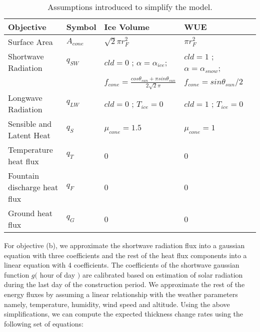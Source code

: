 \documentclass[tc, manuscript]{copernicus}
\begin{document}
\begin{table}[]
\centering
\caption{Assumptions introduced to simplify the model.}
\label{tab:assumptions}
\begin{tabular}{@{}lllll@{}}
\toprule
\textbf{Objective} & \textbf{Symbol} & \textbf{Ice Volume} & \textbf{WUE} & \\ \midrule
\multicolumn{1}{|l}{Surface Area}        & $A_{cone}$ & $ \sqrt{2} \pi r_{F}^2$ & $\pi r_{F}^2$ & \multicolumn{1}{l|}{} \\ \midrule
\multicolumn{1}{|l}{Shortwave Radiation} & $q_{SW}$ & $cld = 0$ ; $\alpha=\alpha_{ice}$; & $cld = 1$ ;
$\alpha=\alpha_{snow}$; & \multicolumn{1}{l|}{} \\ 
\multicolumn{1}{|l}{ } &  & $f_{cone} = \frac{cos \theta_{sun} + \pi sin \theta_{sun}}{2\sqrt{2}\pi}$  & $f_{cone} = sin \theta_{sun} / 2$ & \multicolumn{1}{l|}{} \\ \midrule
\multicolumn{1}{|l}{Longwave Radiation}  & $q_{LW}$ & $cld = 0$ ; $T_{ice} = 0$ & $cld = 1$ ; $T_{ice} = 0$ & \multicolumn{1}{l|}{} \\ \midrule
\multicolumn{1}{|l}{Sensible and Latent Heat}       & $q_{S}$ &$\mu_{cone} = 1.5$  & $\mu_{cone} = 1$ & \multicolumn{1}{l|}{} \\ \midrule
\multicolumn{1}{|l}{Temperature heat flux} & $q_{T}$ & 0 & 0 & \multicolumn{1}{l|}{} \\ \midrule
\multicolumn{1}{|l}{Fountain discharge heat flux} & $q_{F}$ & 0 & 0 & \multicolumn{1}{l|}{} \\ \midrule
\multicolumn{1}{|l}{Ground heat flux}    & $q_{G}$ & 0 & 0 & \multicolumn{1}{l|}{} \\ \bottomrule
\end{tabular}
\end{table}

For objective (b), we approximate the shortwave radiation flux into a gaussian equation with three coefficients
and the rest of the heat flux components into a linear equation with 4 coefficients. The coefficients of the
shortwave gaussian function $g($ hour of day $)$ are calibrated based on estimation of solar radiation during
the last day of the construction period. We approximate the rest of the energy fluxes by assuming a linear
relationship with the weather parameters namely, temperature, humidity, wind speed and altitude. Using the above
simplifications, we can compute the expected thickness change rates using the following set of equations:
\end{document}
